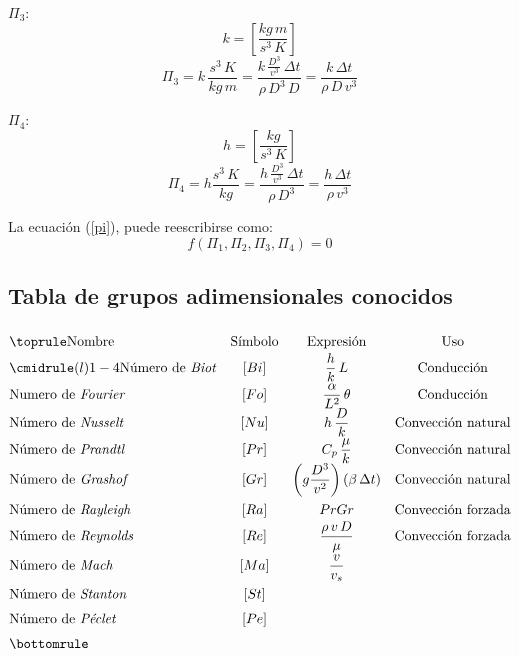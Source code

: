 \begin{enumerate}
        \underline{$\Pi_3$}:\\
        \begin{equation*}
            k = \left[\frac{kg\,m}{s^3\,K}\right]
        \end{equation*}
        \begin{equation*}
            \Pi_3 = k\,\frac{s^3\,K}{kg\,m}
                = \frac{k\,\frac{D^3}{v^3}\,\Delta{t}}{\rho\,D^3\,D}
                = \frac{k\,\Delta{t}}{\rho\,D\,v^3}
        \end{equation*}

        \underline{$\Pi_4$}:\\
        \begin{equation*}
            h = \left[\frac{kg}{s^3\,K}\right]
        \end{equation*}
        \begin{equation*}
            \Pi_4 = h\frac{s^3\,K}{kg}
            = \frac{h\,\frac{D^3}{v^3}\,\Delta{t}}{\rho\,D^3}
            = \frac{h\,\Delta{t}}{\rho\,v^3}
        \end{equation*}

        La ecuación (\ref{pi}), puede reescribirse como:
        \begin{equation}
            f(\Pi_1,\Pi_2,\Pi_3,\Pi_4) = 0
        \end{equation}
\end{enumerate}

\subsection{Tabla de grupos adimensionales conocidos}
\begin{equation*}
\def\arraystretch{1.5}
\begin{array}{@{}lccc@{}}
\toprule
\text{Nombre} & \text{Símbolo} & \text{Expresión} & \text{Uso} \\
\cmidrule(l){1-4}
\text{Número de \emph{Biot}} & [Bi] &
\dfrac{h}{k}\,L & \text{Conducción} \\
\text{Numero de \emph{Fourier}} & [Fo] &
\dfrac{\alpha}{L^2}\,\theta & \text{Conducción} \\
\text{Número de \emph{Nusselt}} & [Nu] &
h\,\dfrac{D}{k} & \text{Convección natural} \\
\text{Número de \emph{Prandtl}} & [Pr] &
C_p\,\dfrac{\mu}{k} & \text{Convección natural} \\
\text{Número de \emph{Grashof}} & [Gr] &
\left(g\dfrac{D^3}{v^2}\right)(\beta\,\Delta{t}) & \text{Convección natural} \\
\text{Número de \emph{Rayleigh}} & [Ra] &
Pr Gr & \text{Convección forzada} \\
\text{Número de \emph{Reynolds}} & [Re] &
\dfrac{\rho\,v\,D}{\mu} & \text{Convección forzada} \\
\text{Número de \emph{Mach}} & [Ma] & \dfrac{v}{v_s} & \\
\text{Número de \emph{Stanton}} & [St] & & \\
\text{Número de \emph{Péclet}} & [Pe] & & \\
\bottomrule
\end{array}
\end{equation*}

